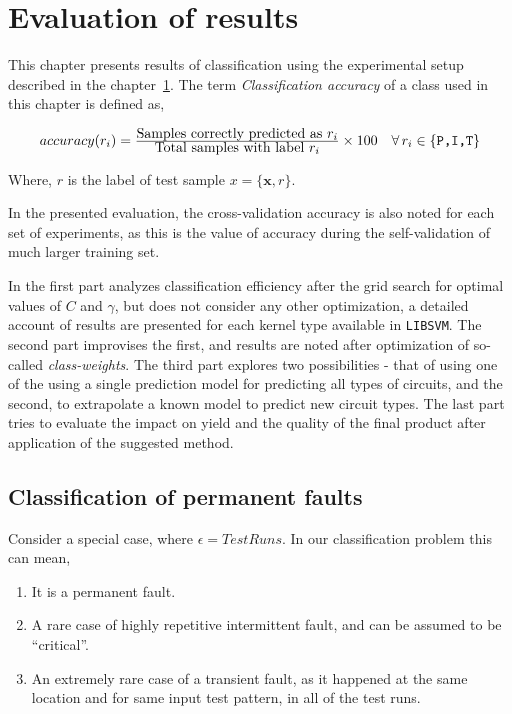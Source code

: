 \chapter{Evaluation of results}
\label{chap:chapter6}
This chapter presents results of classification using the experimental setup described in the chapter~\ref{chap:chapter6}. The term \emph{Classification accuracy} of a class used in this chapter is defined as,

\[ \begin{array}{ll} accuracy(r_i) = \frac{\mbox{Samples correctly predicted as $r_i$}}
								{\mbox{Total samples with label $r_i$}}
							\times 100 & 
							\forall \,r_i \in \{\mbox{\texttt{P,I,T}}\} 
	\end{array}\]

Where, $r$ is the label of test sample $x=\{\boldsymbol{x},r\}$.

In the presented evaluation, the cross-validation accuracy is also noted for each set of experiments, as this is the value of accuracy during the self-validation of much larger training set.

In the first part analyzes classification efficiency after the grid search for optimal values of $C$ and $\gamma$, but does not consider any other optimization, a detailed account of results are presented for each kernel type available in \texttt{LIBSVM}. The second part improvises the first, and results are noted after optimization of so-called \emph{class-weights}. The third part explores two possibilities - that of using one of the using a single prediction model for predicting all types of circuits, and the second, to extrapolate a known model to predict new circuit types. The last part tries to evaluate the impact on yield and the quality of the final product after application of the suggested method.

\section{Classification of permanent faults}
\label{sec:wp}
Consider a special case, where $\epsilon = Test Runs$. In our classification problem this can mean,
\begin{enumerate}
  \item It is a permanent fault.
  \item A rare case of highly repetitive intermittent fault, and can be assumed to be \enquote{critical}.
  \item An extremely rare case of a transient fault, as it happened at the same location and for same input test pattern, in all of the test runs.
\end{enumerate}

